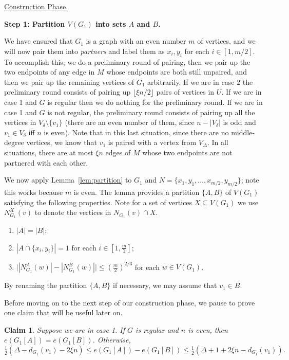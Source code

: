 \documentclass[11pt, oneside]{article}
\newtheorem{claim}{Claim}
\begin{document}
\noindent \underline{{\sc Construction Phase.}}


\noindent \textbf{ Step 1: Partition $V(G_1)$ into sets $A$ and $B$.}

We have ensured that $G_1$ is a graph with an even number $m$ of vertices, and we will now pair them into \emph{partners} and label them as $x_i, y_i$ for each $i\in [1,m/2]$.  
To accomplish this, we do a preliminary round of pairing, then we pair up the two endpoints of any edge in $M$ whose endpoints are both still unpaired, and then we pair up the remaining vertices of $G_1$ arbitrarily. If we are in case 2 the preliminary round consists of pairing up $\lfloor \xi n/2\rfloor$ pairs of vertices in $U$. If we are in case 1 and $G$ is regular then we do nothing for the preliminary round. If we are in case 1 and $G$ is not regular, the preliminary round consists of pairing up all the vertices in $V_\delta\setminus \{v_1\}$ (there are an even number of them, since $n-|V_\delta|$ is odd and $v_1\in V_{\delta}$ iff $n$ is even).  Note that in this last situation, since there are no middle-degree vertices, we know that $v_1$ is paired with a vertex from $V_{\Delta}$. In all situations, there are at most $\xi n$ edges of $M$ whose two endpoints are not partnered with each other.


We now apply Lemma~\ref{lem:partition} to $G_1$  and $N=\{x_1,y_1, \ldots, x_{m/2}, y_{m/2}\}$; note this works because $m$ is even. The lemma provides a partition $\{A,B\}$ of $V(G_1)$ satisfying the following properties. Note for a set of vertices $X\subseteq V(G_1)$ we use $N_{G_1}^X(v)$ to denote the vertices in $N_{G_1}(v)\cap X$.
\begin{enumerate}[(P1)]
	\item  $|A|=|B|$;
	\item $|A\cap \{x_i,y_i\}|=1$ for each $i\in [1, \frac{m}{2}]$;
	\item $\big| |N_{G_1}^A(w)|-|N_{G_1}^B(w)|\big| \le (\tfrac{m}{2})^{2/3}$  for each $w\in V(G_1)$. 
\end{enumerate}
By renaming the partition $\{A,B\}$ if necessary, we may assume that $v_1\in B$.

Before moving on to the next step of our construction phase, we pause to prove one claim that will be useful later on.

\begin{claim}\label{claim:Case1-n-odd-e(A)>e(B)}
    Suppose we are in case 1. If $G$ is regular and $n$ is even, then  $e(G_1[A])=e(G_1[B])$. Otherwise,
    \begin{equation}
       \tfrac{1}{2}(\Delta -d_{G_1}(v_1)-2\xi n)  \le e(G_1[A]) -e(G_1[B]) \le \tfrac{1}{2}(\Delta+1+2\xi n -d_{G_1}(v_1)). 
    \end{equation}
\end{claim}
\end{document}
